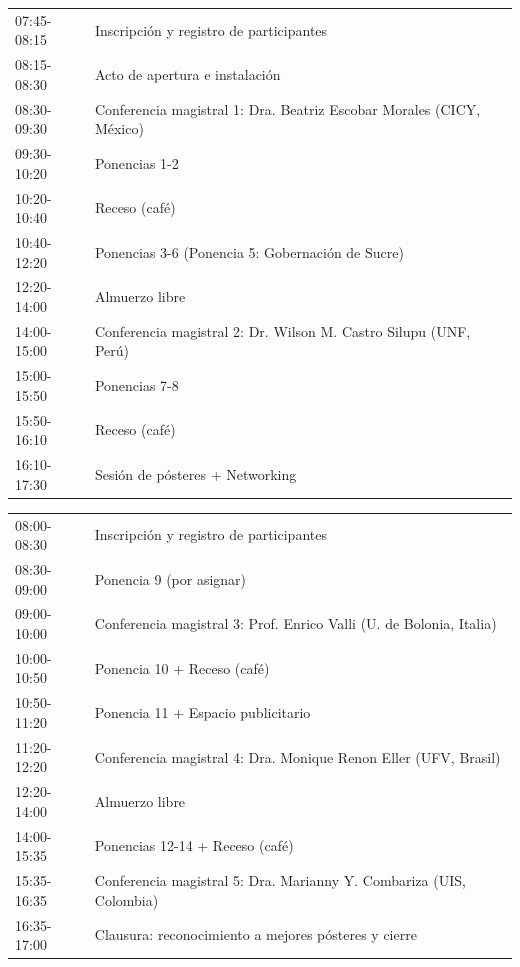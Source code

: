 \documentclass[12pt,a4paper]{article}
\begin{document}
\begin{tcolorbox}[cajadef, title=Día 1 - Lunes 19 de octubre]
\small
\begin{tabular}{ll}
07:45-08:15 & Inscripción y registro de participantes \\
08:15-08:30 & Acto de apertura e instalación \\
08:30-09:30 & Conferencia magistral 1: Dra. Beatriz Escobar Morales (CICY, México) \\
09:30-10:20 & Ponencias 1-2 \\
10:20-10:40 & Receso (café) \\
10:40-12:20 & Ponencias 3-6 (Ponencia 5: Gobernación de Sucre) \\
12:20-14:00 & Almuerzo libre \\
14:00-15:00 & Conferencia magistral 2: Dr. Wilson M. Castro Silupu (UNF, Perú) \\
15:00-15:50 & Ponencias 7-8 \\
15:50-16:10 & Receso (café) \\
16:10-17:30 & Sesión de pósteres + Networking \\
\end{tabular}
\end{tcolorbox}

\begin{tcolorbox}[cajadef, title=Día 2 - Martes 20 de octubre]
\small
\begin{tabular}{ll}
08:00-08:30 & Inscripción y registro de participantes \\
08:30-09:00 & Ponencia 9 (por asignar) \\
09:00-10:00 & Conferencia magistral 3: Prof. Enrico Valli (U. de Bolonia, Italia) \\
10:00-10:50 & Ponencia 10 + Receso (café) \\
10:50-11:20 & Ponencia 11 + Espacio publicitario \\
11:20-12:20 & Conferencia magistral 4: Dra. Monique Renon Eller (UFV, Brasil) \\
12:20-14:00 & Almuerzo libre \\
14:00-15:35 & Ponencias 12-14 + Receso (café) \\
15:35-16:35 & Conferencia magistral 5: Dra. Marianny Y. Combariza (UIS, Colombia) \\
16:35-17:00 & Clausura: reconocimiento a mejores pósteres y cierre \\
\end{tabular}
\end{tcolorbox}
\end{document}
